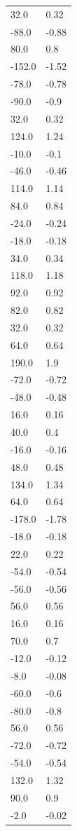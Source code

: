 \begin{longtable}{ll}
32.0 & 0.32 \\
-88.0 & -0.88 \\
80.0 & 0.8 \\
-152.0 & -1.52 \\
-78.0 & -0.78 \\
-90.0 & -0.9 \\
32.0 & 0.32 \\
124.0 & 1.24 \\
-10.0 & -0.1 \\
-46.0 & -0.46 \\
114.0 & 1.14 \\
84.0 & 0.84 \\
-24.0 & -0.24 \\
-18.0 & -0.18 \\
34.0 & 0.34 \\
118.0 & 1.18 \\
92.0 & 0.92 \\
82.0 & 0.82 \\
32.0 & 0.32 \\
64.0 & 0.64 \\
190.0 & 1.9 \\
-72.0 & -0.72 \\
-48.0 & -0.48 \\
16.0 & 0.16 \\
40.0 & 0.4 \\
-16.0 & -0.16 \\
48.0 & 0.48 \\
134.0 & 1.34 \\
64.0 & 0.64 \\
-178.0 & -1.78 \\
-18.0 & -0.18 \\
22.0 & 0.22 \\
-54.0 & -0.54 \\
-56.0 & -0.56 \\
56.0 & 0.56 \\
16.0 & 0.16 \\
70.0 & 0.7 \\
-12.0 & -0.12 \\
-8.0 & -0.08 \\
-60.0 & -0.6 \\
-80.0 & -0.8 \\
56.0 & 0.56 \\
-72.0 & -0.72 \\
-54.0 & -0.54 \\
132.0 & 1.32 \\
90.0 & 0.9 \\
-2.0 & -0.02 \\

\end{longtable}
